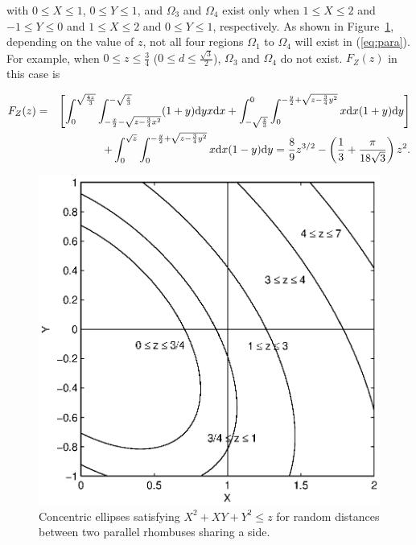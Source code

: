 \documentclass[12pt,draftclsnofoot,onecolumn]{IEEEtran}
\begin{document}
with $0 \leq X \leq 1$, $0 \leq Y \leq 1$, and $\Omega_3$ and $\Omega_4$ exist only when
$1 \leq X \leq 2$ and $-1 \leq Y \leq 0$ and $1 \leq X \leq 2$ and $0 \leq Y \leq 1$, respectively.
As shown in Figure~\ref{fig:para}, depending on the value of $z$, not all four regions
$\Omega_1$ to $\Omega_4$ will exist in (\ref{eq:para}).
For example, when $0\leq z \leq \frac{3}{4}$ ($0\leq d\leq \frac{\sqrt{3}}{2}$), $\Omega_3$ and $\Omega_4$
do not exist. $F_Z(z)$ in this case is
\begin{small}
\begin{eqnarray}\label{eq:Z1_r_para}
 F_Z(z)&=&\left[\int_0^{\sqrt{\frac{4z}{3}}}\int_{-\frac{x}{2}-\sqrt{z-\frac{3}{
4}x^2}}^{-\sqrt{\frac{z}{3}}}(1+y){\rm d}yx{\rm d}x+\int_{-\sqrt{\frac{z}{3}}}
^0\int_0^{-\frac{y}{2}+\sqrt{z-\frac{3}{4}y^2}}x{\rm d}x(1+y){\rm d}y\right]
\nonumber\\
&&+\int_0^{\sqrt{z}}\int_0^{-\frac{y}{2}+\sqrt{z-\frac{3}{4}y^2}}
x{\rm d}x(1-y){\rm
d}y=\frac{8}{9}z^{3/2}-\left(\frac{1}{3}+\frac{\pi}{18\sqrt{3}}
\right)z^2.
\end{eqnarray}
\end{small}

\begin{figure}
  \centering
  \includegraphics[width=0.5\columnwidth]{fig/rhombus_para}
  \caption{Concentric ellipses satisfying $X^2+XY+Y^2 \leq z$ for random distances between two parallel rhombuses sharing a side.}
  \label{fig:para}
\end{figure}
\end{document}
